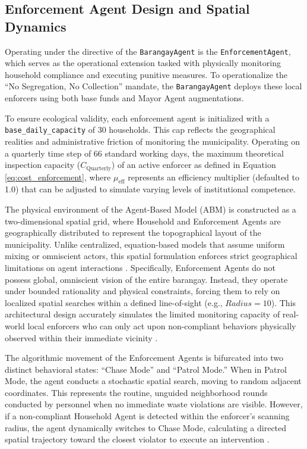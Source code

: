 \subsection{Enforcement Agent Design and Spatial Dynamics}

Operating under the directive of the \texttt{BarangayAgent} is the \texttt{EnforcementAgent}, which serves as the operational extension tasked with physically monitoring household compliance and executing punitive measures. To operationalize the ``No Segregation, No Collection'' mandate, the \texttt{BarangayAgent} deploys these local enforcers using both base funds and Mayor Agent augmentations. 

To ensure ecological validity, each enforcement agent is initialized with a \texttt{base\_daily\_capacity} of 30 households. This cap reflects the geographical realities and administrative friction of monitoring the municipality. Operating on a quarterly time step of 66 standard working days, the maximum theoretical inspection capacity ($C_{\mathrm{Quarterly}}$) of an active enforcer as defined in Equation \ref{eq:cost_enforcement}, where $\mu_{\mathrm{eff}}$ represents an efficiency multiplier (defaulted to 1.0) that can be adjusted to simulate varying levels of institutional competence.

The physical environment of the Agent-Based Model (ABM) is constructed as a two-dimensional spatial grid, where Household and Enforcement Agents are geographically distributed to represent the topographical layout of the municipality. Unlike centralized, equation-based models that assume uniform mixing or omniscient actors, this spatial formulation enforces strict geographical limitations on agent interactions \citep{Meng2018}. Specifically, Enforcement Agents do not possess global, omniscient vision of the entire barangay. Instead, they operate under bounded rationality and physical constraints, forcing them to rely on localized spatial searches within a defined line-of-sight (e.g., $Radius = 10$). This architectural design accurately simulates the limited monitoring capacity of real-world local enforcers who can only act upon non-compliant behaviors physically observed within their immediate vicinity \citep{Dalugdog2021, TianReview2024}.

The algorithmic movement of the Enforcement Agents is bifurcated into two distinct behavioral states: ``Chase Mode'' and ``Patrol Mode.'' When in Patrol Mode, the agent conducts a stochastic spatial search, moving to random adjacent coordinates. This represents the routine, unguided neighborhood rounds conducted by personnel when no immediate waste violations are visible. However, if a non-compliant Household Agent is detected within the enforcer's scanning radius, the agent dynamically switches to Chase Mode, calculating a directed spatial trajectory toward the closest violator to execute an intervention \citep{Zhao2022}. 

